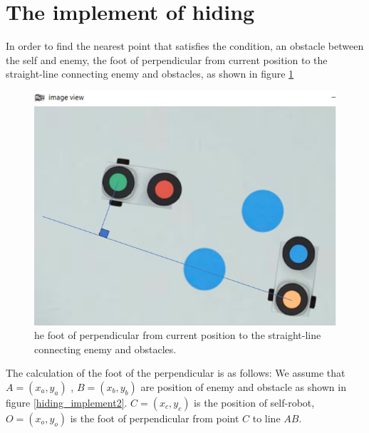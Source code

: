 \section{The implement of hiding}
In order to find the nearest point that satisfies the condition, an obstacle between the self and enemy, the foot of perpendicular from current position to the straight-line connecting enemy and obstacles, as shown in figure \ref{hiding_implement1}

\begin{figure}[thb]
    \centering
    \includegraphics[width=1\textwidth]{images/implementofhiding1.png}
    \caption[he foot of perpendicular from current position to the straight-line connecting enemy and obstacles]{he foot of perpendicular from current position to the straight-line connecting enemy and obstacles.}\label{hiding_implement1}
\end{figure}

The calculation of the foot of the perpendicular is as follows:
We assume that $A=(x_{a},y_{a})$ ,  $B=(x_{b},y_{b})$ are position of enemy and obstacle as shown in figure \ref{hiding_implement2}. $C=(x_{c},y_{c})$ is the position of self-robot, $O=(x_{o},y_{o})$ is the foot of perpendicular from point $C$ to line $AB$.

